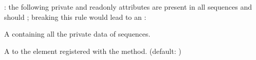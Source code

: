 \documentclass[letterpaper,10pt,english]{sphinxmanual}
\begin{document}
\sphinxAtStartPar
{}: the following private and read\sphinxhyphen{}only attributes are present in all sequences and should ; breaking this rule would lead to an :
\begin{description}
\sphinxAtStartPar
A  containing all the private data of sequences.

\sphinxAtStartPar
A  to the element registered with the  method. (default: )

\end{description}
\end{document}
